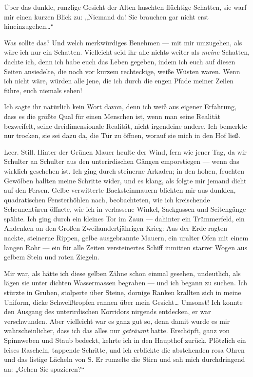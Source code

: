 Über das dunkle, runzlige Gesicht der Alten huschten flüchtige
Schatten, sie warf mir einen kurzen Blick zu: „Niemand da! Sie
brauchen gar nicht erst hineinzugehen\ldots{}“

Was sollte das? Und welch merkwürdiges Benehmen — mit mir
umzugehen, als wäre ich nur ein Schatten. Vielleicht seid ihr alle
nichts weiter als \emph{meine} Schatten, dachte ich, denn ich habe euch
das Leben gegeben, indem ich euch auf diesen Seiten ansiedelte, die
noch vor kurzem rechteckige, weiße Wüsten waren. Wenn ich nicht
wäre, würden alle jene, die ich durch die engen Pfade meiner Zeilen
führe, euch niemals sehen!

Ich sagte ihr natürlich kein Wort davon, denn ich weiß aus eigener
Erfahrung, dass es die größte Qual für einen Menschen ist, wenn man
seine Realität bezweifelt, seine dreidimensionale Realität, nicht
irgendeine andere. Ich bemerkte nur trocken, sie sei dazu da, die
Tür zu öffnen, worauf sie mich in den Hof ließ.

Leer. Still. Hinter der Grünen Mauer heulte der Wind, fern wie
jener Tag, da wir Schulter an Schulter aus den unterirdischen
Gängen emporstiegen — wenn das wirklich geschehen ist. Ich ging
durch steinerne Arkaden; in den hohen, feuchten Gewölben hallten
meine Schritte wider, und es klang, als folgte mir jemand dicht auf
den Fersen. Gelbe verwitterte Backsteinmauern blickten mir aus
dunklen, quadratischen Fensterhöhlen nach, beobachteten, wie ich
kreischende Scheunentüren öffnete, wie ich in verlassene Winkel,
Sackgassen und Seitengänge spähte. Ich ging durch ein kleines Tor
im Zaun — dahinter ein Trümmerfeld, ein Andenken an den Großen
Zweihundertjährigen Krieg: Aus der Erde ragten nackte, steinerne
Rippen, gelbe ausgebrannte Mauern, ein uralter Ofen mit einem
langen Rohr — ein für alle Zeiten versteinertes Schiff inmitten
starrer Wogen aus gelbem Stein und roten Ziegeln.

Mir war, als hätte ich diese gelben Zähne schon einmal gesehen,
undeutlich, als lägen sie unter dichten Wassermassen begraben — und
ich begann zu suchen. Ich stürzte in Gruben, stolperte über Steine,
dornige Ranken krallten sich in meine Uniform, dicke Schweißtropfen
rannen über mein Gesicht\ldots{} Umsonst! Ich konnte den Ausgang des
unterirdischen Korridors nirgends entdecken, er war verschwunden.
Aber vielleicht war es ganz gut so, denn damit wurde es mir
wahrscheinlicher, dass ich das alles nur \emph{geträumt} hatte. Erschöpft,
ganz von Spinnweben und Staub bedeckt, kehrte ich in den Haupthof
zurück. Plötzlich ein leises Rascheln, tappende Schritte, und ich
erblickte die abstehenden rosa Ohren und das listige Lächeln von S.
Er runzelte die Stirn und sah mich durchdringend an: „Gehen Sie
spazieren?“

